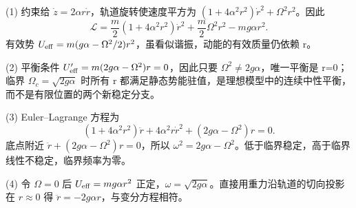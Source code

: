 (1) 约束给 \(\dot z=2\alpha r\dot r\)，轨道旋转使速度平方为 \((1+4\alpha^2r^2)\dot r^2+\Omega^2r^2\)。因此
\[
\mathcal L=\frac m2(1+4\alpha^2r^2)\dot r^2+\frac m2\Omega^2r^2-mg\alpha r^2.
\]
有效势 \(U_{\rm eff}=m(g\alpha-\Omega^2/2)r^2\)，虽看似谐振，动能的有效质量仍依赖 r。

(2) 平衡条件 \(U'_{\rm eff}=m(2g\alpha-\Omega^2)r=0\)，因此只要 \(\Omega^2\ne2g\alpha\)，唯一平衡是 r=0；临界 \(\Omega_c=\sqrt{2g\alpha}\) 时所有 r 都满足静态势能驻值，是理想模型中的连续中性平衡，而不是有限位置的两个新稳定分支。

(3) Euler–Lagrange 方程为
\[
(1+4\alpha^2r^2)\ddot r+4\alpha^2r\dot r^2+(2g\alpha-\Omega^2)r=0.
\]
底点附近 \(\ddot r+(2g\alpha-\Omega^2)r=0\)，所以 \(\omega^2=2g\alpha-\Omega^2\)。低于临界稳定，高于临界线性不稳定，临界频率为零。

(4) 令 \(\Omega=0\) 后 \(U_{\rm eff}=mg\alpha r^2\) 正定，\(\omega=\sqrt{2g\alpha}\)。直接用重力沿轨道的切向投影在 \(r\approx 0\) 得 \(\ddot r=-2g\alpha r\)，与变分方程相符。
